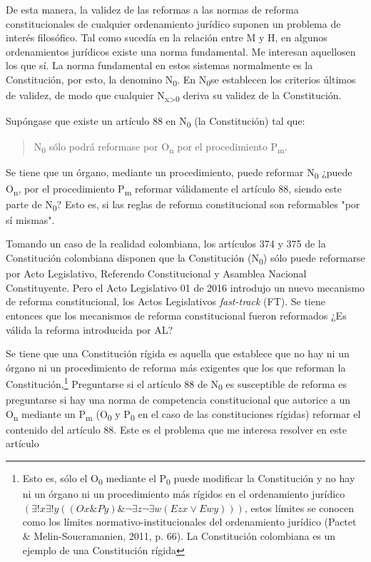 \documentclass[]{book}
\begin{document}
\begin{refsection}
De esta manera, la validez de las reformas a las normas de reforma
constitucionales de cualquier ordenamiento jurídico suponen un
problema de interés filosófico. Tal como sucedía en la relación entre M
y H, en algunos ordenamientos jurídicos existe una norma fundamental. Me interesan aquellosen los que sí. La norma fundamental en estos sistemas normalmente es la
Constitución, por esto, la denomino N\textsubscript{0}. En
N\textsubscript{0}se establecen los criterios últimos de validez, de
modo que cualquier N\textsubscript{x\textgreater{}0} deriva su validez
de la Constitución.

Supóngase que existe un artículo 88 en N\textsubscript{0} (la
Constitución) tal que:

\begin{quote}
	N\textsubscript{0} sólo podrá reformase por O\textsubscript{n} por el
	procedimiento P\textsubscript{m}.
\end{quote}


Se tiene que un órgano, mediante un procedimiento, puede reformar
N\textsubscript{0} ¿puede O\textsubscript{n}, por el procedimiento
P\textsubscript{m} reformar válidamente el artículo 88, siendo este
parte de N\textsubscript{0}? Esto es, si las reglas de reforma constitucional son reformables "por sí mismas".

Tomando un caso de la realidad colombiana, los artículos 374 y 375 de la
Constitución colombiana disponen que la Constitución
(N\textsubscript{0}) sólo puede reformarse por Acto Legislativo,
Referendo Constitucional y Asamblea Nacional Constituyente. Pero el Acto
Legislativo 01 de 2016 introdujo un nuevo mecanismo de reforma
constitucional, los Actos Legislativos \emph{fast-track} (FT). Se tiene
entonces que los mecanismos de reforma constitucional fueron reformados
¿Es válida la reforma introducida por AL?

Se tiene que una Constitución rígida es aquella
\protect\hypertarget{_Hlk495394696}{}{}que establece que no hay ni un
órgano ni un procedimiento de reforma más exigentes que los que reforman
la Constitución,\footnote{Esto es, sólo el O\textsubscript{0} mediante
  el P\textsubscript{0} puede modificar la Constitución y no hay ni un
  órgano ni un procedimiento más rígidos en el ordenamiento jurídico $(\exists!x \exists!y ((Ox \& Py)  \& ¬\exists z ¬\exists w (Ezx \lor Ewy)))$, estos límites se conocen como los límites
  normativo-institucionales del ordenamiento jurídico (Pactet \& Melin-Soucramanien, 2011,  p. 66). La Constitución colombiana es un ejemplo de una Constitución
  rígida} 
Preguntarse si el artículo 88 de N\textsubscript{0} es
susceptible de reforma es preguntarse si hay una norma de competencia
constitucional que autorice a un O\textsubscript{n} mediante un
P\textsubscript{m} (O\textsubscript{0} y P\textsubscript{0} en el caso
de las constituciones rígidas) reformar el contenido del artículo 88. Este es el problema que me interesa resolver en este artículo


\end{refsection}
\end{document}
